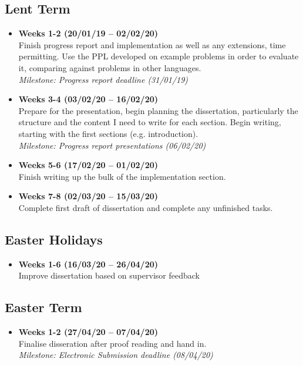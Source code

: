 \subsection*{Lent Term}
\begin{itemize}
      \item \textbf{Weeks 1-2 (20/01/19 -- 02/02/20)}\\ Finish progress report and implementation as well as any extensions, time permitting. Use the PPL developed on example problems in order to evaluate it, comparing against problems in other languages.
            \\ \textit{Milestone: Progress report deadline (31/01/19)}
      \item \textbf{Weeks 3-4 (03/02/20 -- 16/02/20)}\\ Prepare for the presentation, begin planning the dissertation, particularly the structure and the content I need to write for each section. Begin writing, starting with the first sections (e.g. introduction).
            \\ \textit{Milestone: Progress report presentations (06/02/20)}
      \item \textbf{Weeks 5-6 (17/02/20 -- 01/02/20)}\\ Finish writing up the bulk of the implementation section.
      \item \textbf{Weeks 7-8 (02/03/20 -- 15/03/20)}\\ Complete first draft of dissertation and complete any unfinished tasks.
\end{itemize}
\subsection*{Easter Holidays}
\begin{itemize}
      \item \textbf{Weeks 1-6 (16/03/20 -- 26/04/20)}\\ Improve dissertation based on supervisor feedback
\end{itemize}
\subsection*{Easter Term}
\begin{itemize}
      \item \textbf{Weeks 1-2 (27/04/20 -- 07/04/20)}\\ Finalise disseration after proof reading and hand in.
            \\ \textit{Milestone: Electronic Submission deadline (08/04/20)}
\end{itemize}



